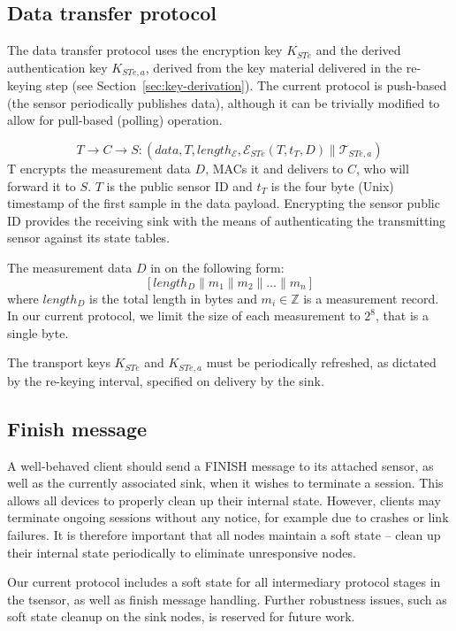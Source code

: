 \subsection{Data transfer protocol}

The data transfer protocol uses the encryption key $K_{STe}$ and the derived authentication key $K_{STe,a}$, derived from the key material delivered in the re-keying step (see Section~\ref{sec:key-derivation}). The current protocol is push-based (the sensor periodically publishes data), although it can be trivially modified to allow for pull-based (polling) operation.

\[
T \rightarrow C \rightarrow S: (\textit{data},T,length_{\mathcal{E}},\mathcal{E}_{STe}(T,t_T,D) \parallel \mathcal{T}_{STe,a})
\]
%
T encrypts the measurement data $D$, MACs it and delivers to
$C$, who will forward it to $S$. $T$ is the public sensor ID and $t_T$ is the four byte (Unix) timestamp of the first sample in the data payload.
Encrypting the sensor public ID provides the receiving sink with the means of authenticating the transmitting sensor against its state tables.


The measurement data $D$ in on the following form:
%
\[
[ length_D \parallel m_1 \parallel m_2 \parallel \dots \parallel m_n ]
\]
%
where $length_D$ is the total length in bytes and $m_i \in \mathbb{Z}$ is a measurement
record. %
In our current protocol, we limit the size of each measurement to $2^8$, that is a single byte.

The transport keys $K_{STe}$ and $K_{STe,a}$ must be periodically refreshed, as dictated by the re-keying interval, specified on delivery by the sink.

\subsection{Finish message}

A well-behaved client should send a FINISH message to its attached sensor, as well as the currently associated sink, when it wishes to
terminate a session. This allows all devices to properly clean up their internal state. However, clients may terminate ongoing sessions without any notice, for example due to crashes or link failures. It is therefore important that all nodes maintain a soft state -- clean up their internal state periodically to eliminate unresponsive nodes. 

Our current protocol includes a soft state for all intermediary protocol stages in the tsensor, as well as finish message handling. Further robustness issues, such as soft state cleanup on the sink nodes, is reserved for future work.

